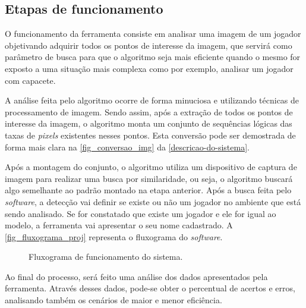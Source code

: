 \subsection{{Etapas de funcionamento}}

O funcionamento da ferramenta consiste em analisar uma imagem de um jogador objetivando adquirir todos os pontos de interesse da imagem, que servirá como parâmetro de busca para que o algoritmo seja mais eficiente quando o  mesmo for exposto a uma situação mais complexa como por exemplo, analisar um jogador com capacete.

A análise feita pelo algoritmo ocorre de forma minuciosa e utilizando técnicas de processamento de imagem. Sendo assim, após a extração de todos os pontos de interesse da imagem, o algoritmo monta um conjunto de sequências lógicas das taxas de \textit{pixels} existentes nesses pontos. Esta conversão pode ser demostrada de forma mais clara na \autoref{fig_conversao_img} da \autoref{descricao-do-sistema}.

Após a montagem do conjunto, o algoritmo utiliza um dispositivo de captura de imagem para realizar uma busca por similaridade, ou seja, o algoritmo buscará algo semelhante ao padrão montado na etapa anterior. Após a busca feita pelo \textit{software}, a detecção vai definir se existe ou não um jogador no ambiente que está sendo analisado. Se for constatado que existe um jogador e ele for igual ao modelo, a ferramenta vai apresentar o seu nome cadastrado. A \autoref{fig_fluxograma_proj} representa o fluxograma do \textit{software}.

\begin{figure}[h]
	\caption{\label{fig_fluxograma_proj}Fluxograma de funcionamento do sistema.}
	\begin{center}
	\end{center}
	\centering {}
\end{figure}

Ao final do processo, será feito uma análise dos dados apresentados pela ferramenta. Através desses dados, pode-se obter o percentual de acertos e erros, analisando também os cenários de maior e menor eficiência.